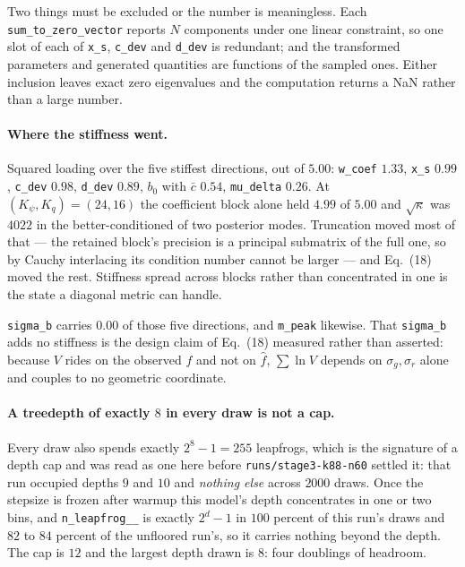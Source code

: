 \documentclass[11pt]{article}
\newcommand{\file}[1]{\texttt{#1}}
\newcommand{\code}[1]{\texttt{#1}}
\begin{document}
Two things must be excluded or the number is meaningless. Each \code{sum\_to\_zero\_vector}
reports $N$ components under one linear constraint, so one slot of each of \code{x\_s},
\code{c\_dev} and \code{d\_dev} is redundant; and the transformed parameters and generated
quantities are functions of the sampled ones. Either inclusion leaves exact zero
eigenvalues and the computation returns a NaN rather than a large number.

\paragraph{Where the stiffness went.} Squared loading over the five stiffest directions,
out of $5.00$: \code{w\_coef} $1.33$, \code{x\_s} $0.99$, \code{c\_dev} $0.98$,
\code{d\_dev} $0.89$, $b_{0}$ with $\bar c$ $0.54$, \code{mu\_delta} $0.26$. At
$(K_{\psi}, K_{q}) = (24, 16)$ the coefficient block alone held $4.99$ of $5.00$ and
$\sqrt{\kappa}$ was $4022$ in the better-conditioned of two posterior modes. Truncation
moved most of that --- the retained block's precision is a principal submatrix of the full
one, so by Cauchy interlacing its condition number cannot be larger --- and
Eq.~(18) moved the rest. Stiffness spread across blocks rather than concentrated in
one is the state a diagonal metric can handle.

\code{sigma\_b} carries $0.00$ of those five directions, and \code{m\_peak} likewise. That
\code{sigma\_b} adds no stiffness is the design claim of Eq.~(18) measured rather
than asserted: because $V$ rides on the observed $f$ and not on $\hat f$, $\sum \ln V$
depends on $\sigma_{g}, \sigma_{r}$ alone and couples to no geometric coordinate.

\paragraph{A treedepth of exactly $8$ in every draw is not a cap.} Every draw also spends
exactly $2^{8} - 1 = 255$ leapfrogs, which is the signature of a depth cap and was read as
one here before \file{runs/stage3-k88-n60} settled it: that run occupied depths $9$ and
$10$ and \emph{nothing else} across $2000$ draws. Once the stepsize is frozen after warmup
this model's depth concentrates in one or two bins, and \code{n\_leapfrog\_\_} is exactly
$2^{d} - 1$ in $100$ percent of this run's draws and $82$ to $84$ percent of the unfloored
run's, so it carries nothing beyond the depth. The cap is $12$ and the largest depth drawn
is $8$: four doublings of headroom.
\end{document}
